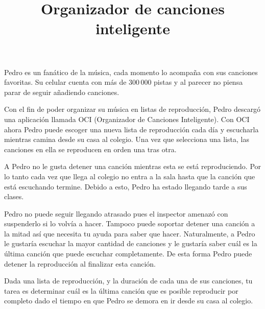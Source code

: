 \documentclass{oci}
\title{Organizador de canciones inteligente}
\begin{document}
\begin{problemDescription}
Pedro es un fanático de la música, cada momento lo acompaña con
sus canciones favoritas.
Su celular cuenta con más de 300\,000 pistas y al parecer no piensa parar de seguir
añadiendo canciones.

Con el fin de poder organizar su música en listas de reproducción, Pedro
descargó una aplicación llamada OCI (Organizador de Canciones Inteligente).
Con OCI ahora Pedro puede escoger una nueva lista de reproducción cada día y
escucharla mientras camina desde su casa al colegio.
Una vez que selecciona una lista, las canciones en ella se reproducen en orden
una tras otra.

A Pedro no le gusta detener una canción mientras esta se está reproduciendo.
Por lo tanto cada vez que llega al colegio no entra a la sala hasta que la
canción que está escuchando termine.
Debido a esto, Pedro ha estado llegando tarde a sus clases.

Pedro no puede seguir llegando atrasado pues el inspector amenazó
con suspenderlo si lo volvía a hacer.
Tampoco puede soportar detener una canción a la mitad así que necesita tu ayuda
para saber que hacer.
Naturalmente, a Pedro le gustaría escuchar la mayor cantidad de canciones y le
gustaría saber cuál es la última canción que puede escuchar completamente.
De esta forma Pedro puede detener la reproducción al finalizar esta canción.

Dada una lista de reproducción, y la duración de cada una de sus canciones, tu
tarea es determinar cuál es la última canción que es posible reproducir
por completo dado el tiempo en que Pedro se demora en ir desde su casa al colegio.

\end{problemDescription}
\end{document}
